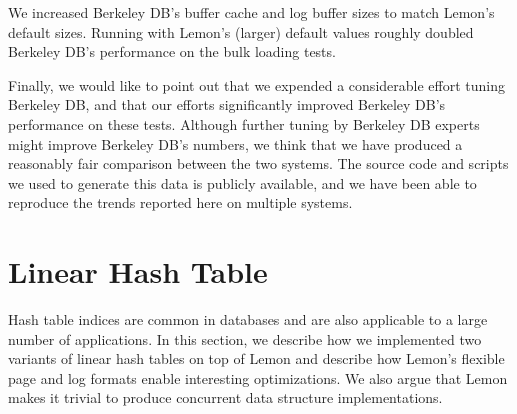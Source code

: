 \documentclass[10pt,letterpaper,twocolumn,english]{article}
\newcommand{\yad}{Lemon\xspace}
\begin{document}
We increased Berkeley DB's buffer cache and log buffer sizes to match
\yad's default sizes.  Running with \yad's (larger) default values
roughly doubled Berkeley DB's performance on the bulk loading tests.

Finally, we would like to point out that we expended a considerable
effort tuning Berkeley DB, and that our efforts significantly
improved Berkeley DB's performance on these tests.  Although further
tuning by Berkeley DB experts might improve Berkeley DB's
numbers, we think that we have produced a reasonably fair comparison
between the two systems.  The source code and scripts we used to
generate this data is publicly available, and we have been able to
reproduce the trends reported here on multiple systems.


\section{Linear Hash Table\label{sub:Linear-Hash-Table}}



%

Hash table indices are common in databases and are also applicable to
a large number of applications.  In this section, we describe how we
implemented two variants of linear hash tables on top of \yad and
describe how \yad's flexible page and log formats enable interesting
optimizations.  We also argue that \yad makes it trivial to produce
concurrent data structure implementations.
\end{document}
